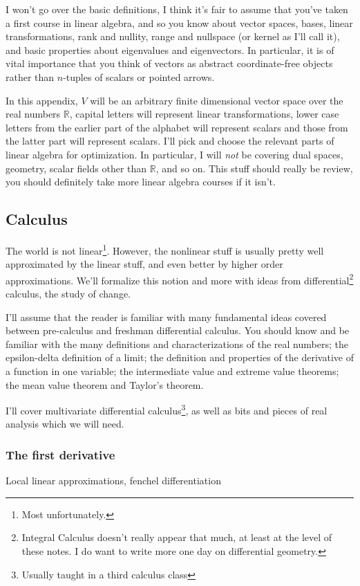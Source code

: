 \documentclass[11pt]{article}
\numberwithin{equation}{section}
\theoremstyle{definition}
\newcommand{\bR}{\mathbb{R}}
\begin{document}
I won't go over the basic definitions, I think it's fair to assume that you've taken a first course in linear algebra, and so you know about vector spaces, bases, linear transformations, rank and nullity, range and nullspace (or kernel as I'll call it), and basic properties about eigenvalues and eigenvectors. In particular, it is of vital importance that you think of vectors as abstract coordinate-free objects rather than $n$-tuples of scalars or pointed arrows.

In this appendix, $V$ will be an arbitrary finite dimensional vector space over the real numbers $\bR$, capital letters will represent linear transformations, lower case letters from the earlier part of the alphabet will represent scalars and those from the latter part will represent scalars. I'll pick and choose the relevant parts of linear algebra for optimization. In particular, I will \textit{not} be covering dual spaces, geometry, scalar fields other than $\bR$, and so on. This stuff should really be review, you should definitely take more linear algebra courses if it isn't.
\subsection{Calculus}
The world is not linear\footnote{Most unfortunately.}. However, the nonlinear stuff is usually pretty well approximated by the linear stuff, and even better by higher order approximations. We'll formalize this notion and more with ideas from differential\footnote{Integral Calculus doesn't really appear that much, at least at the level of these notes. I do want to write more one day on differential geometry.} calculus, the study of change.

I'll assume that the reader is familiar with many fundamental ideas covered between pre-calculus and freshman differential calculus. You should know and be familiar with the many definitions and characterizations of the real numbers; the epsilon-delta definition of a limit; the definition and properties of the derivative of a function in one variable; the intermediate value and extreme value theorems; the mean value theorem and Taylor's theorem.

I'll cover multivariate differential calculus\footnote{Usually taught in a third calculus class}, as well as bits and pieces of real analysis which we will need.
\subsubsection{The first derivative}
Local linear approximations, fenchel differentiation
\end{document}
